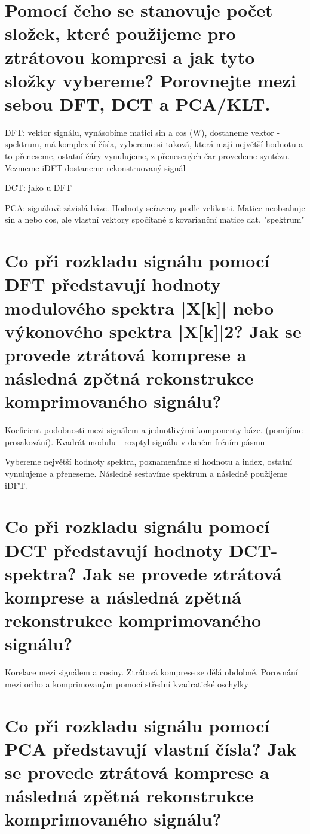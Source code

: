 \documentclass[a4paper,12pt]{article}   %
\begin{document}
\section{Pomocí čeho se stanovuje počet složek, které použijeme pro ztrátovou kompresi a jak tyto složky vybereme? Porovnejte mezi sebou DFT, DCT a PCA/KLT.}
DFT: vektor signálu, vynásobíme matici sin a cos (W), dostaneme vektor - spektrum, má komplexní čísla, vybereme si taková, která mají největší hodnotu a to přeneseme, ostatní čáry vynulujeme, z přenesených čar provedeme syntézu. Vezmeme iDFT dostaneme rekonstruovaný signál

DCT: jako u DFT

PCA: signálově závislá báze. Hodnoty seřazeny podle velikosti. Matice neobsahuje sin a nebo cos, ale vlastní vektory spočítané z kovarianční matice dat. "spektrum"


\section{Co při rozkladu signálu pomocí DFT představují hodnoty modulového spektra |X[k]| nebo výkonového spektra |X[k]|2? Jak se provede ztrátová komprese a následná zpětná rekonstrukce komprimovaného signálu?}

Koeficient podobnosti mezi signálem a jednotlivými komponenty báze. (pomíjíme prosakování). Kvadrát modulu - rozptyl signálu v daném frčním pásmu

Vybereme největší hodnoty spektra, poznamenáme si hodnotu a index, ostatní vynulujeme a přeneseme. Následně sestavíme spektrum a následně použijeme iDFT.

\section{Co při rozkladu signálu pomocí DCT představují hodnoty DCT-spektra? Jak se provede ztrátová komprese a následná zpětná rekonstrukce komprimovaného signálu?}

Korelace mezi signálem a cosiny. Ztrátová komprese se dělá obdobně. Porovnání mezi oriho a komprimovaným pomocí střední kvadratické oschylky

\section{Co při rozkladu signálu pomocí PCA představují vlastní čísla? Jak se provede ztrátová komprese a následná zpětná rekonstrukce komprimovaného signálu?}
\end{document}
